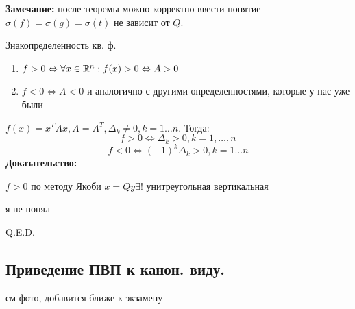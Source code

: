 \textbf{Замечание:} после теоремы можно корректно ввести понятие $\sigma(f)=\sigma(g)= \sigma(t)$ не зависит от $Q$.

 Знакопределенность кв. ф.

\begin{enumerate}
    \item $f > 0 \Leftrightarrow \forall x \in \mathbb{R}^n: f(x)>0 \Leftrightarrow A >0$
    \item $f<0 \Leftrightarrow A<0$
    и аналогично с другими определенностями, которые у нас уже были
\end{enumerate}


$f(x)  = x^T Ax , A = A^T, \Delta_k \neq 0 , k = 1\ldots n$. Тогда:
$$f >0 \Leftrightarrow \Delta_k > 0, k = 1, \ldots, n$$
$$f <0 \Leftrightarrow (-1)^k \Delta_k >0, k = 1\ldots n$$
\textbf{Доказательство:}

$f>0$ по методу Якоби $x = Qy \exists !$ унитреугольная вертикальная 

я не понял

\hfill Q.E.D.

\pagebreak


\subsection{Приведение ПВП к канон. виду.}

см фото, добавится ближе к экзамену